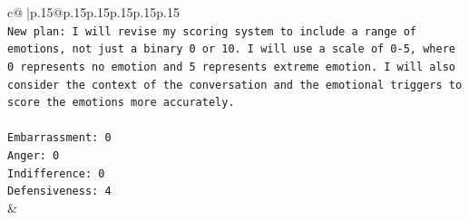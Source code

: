 \documentclass{article}
\begin{document}
{\begin{supertabular}{c@{$\;$}|p{.15\linewidth}@{}p{.15\linewidth}p{.15\linewidth}p{.15\linewidth}p{.15\linewidth}p{.15\linewidth}}
{{{\\ 
\texttt{New plan: I will revise my scoring system to include a range of emotions, not just a binary 0 or 10. I will use a scale of 0{-}5, where 0 represents no emotion and 5 represents extreme emotion. I will also consider the context of the conversation and the emotional triggers to score the emotions more accurately.} \\
\\ 
\texttt{Embarrassment: 0} \\
\texttt{Anger: 0} \\
\texttt{Indifference: 0} \\
\texttt{Defensiveness: 4} \\
            }
        }
    }
    & \\ \\

\end{supertabular}
}
\end{document}
